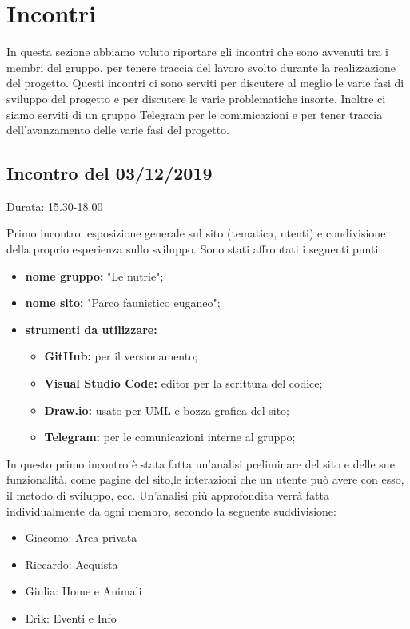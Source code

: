 \section{Incontri}
In questa sezione abbiamo voluto riportare gli incontri che sono avvenuti tra i membri del gruppo, per tenere traccia del lavoro svolto durante la realizzazione del progetto. Questi incontri ci sono serviti per discutere al meglio le varie fasi di sviluppo del progetto e per discutere le varie problematiche insorte. Inoltre ci siamo serviti di un gruppo Telegram per le comunicazioni e per tener traccia dell'avanzamento delle varie fasi del progetto.

\subsection{Incontro del 03/12/2019}
    Durata: 15.30-18.00

    Primo incontro: esposizione generale sul sito (tematica, utenti) e condivisione della proprio esperienza sullo sviluppo.
    Sono stati affrontati i seguenti punti:
    
    \begin{itemize}
        \item \textbf{nome gruppo:} "Le nutrie"; 
        \item \textbf{nome sito:} "Parco faunistico euganeo"; 
        \item \textbf{strumenti da utilizzare:}
            \begin{itemize}
                \item \textbf{GitHub:} per il versionamento; 
                \item \textbf{Visual Studio Code:} editor per la scrittura del codice; 
                \item \textbf{Draw.io:} usato per UML e bozza grafica del sito;
                \item \textbf{Telegram:} per le comunicazioni interne al gruppo;
            \end{itemize}
    \end{itemize}

    In questo primo incontro è stata fatta un'analisi preliminare del sito e delle sue funzionalità, come pagine del sito,le interazioni che un utente può avere con esso, il metodo di sviluppo, ecc.
    Un'analisi più approfondita verrà fatta individualmente da ogni membro, secondo la seguente suddivisione:
    \begin{itemize}
        \item Giacomo: Area privata
        \item Riccardo: Acquista
        \item Giulia: Home e Animali
        \item Erik: Eventi e Info
    \end{itemize}


